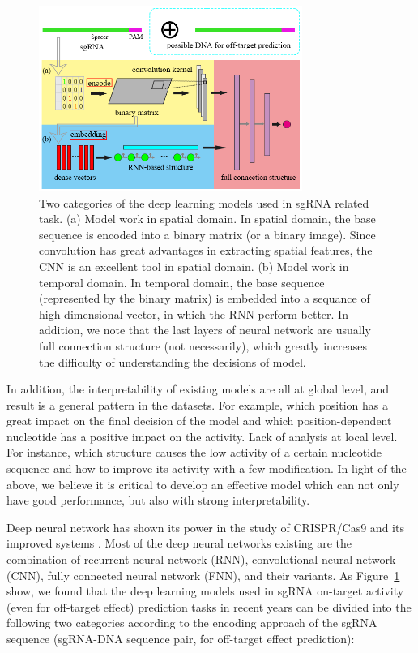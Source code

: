\documentclass{bioinfo}
\begin{document}
 \begin{figure}[!tpb]%
    \centerline{\includegraphics[width=86mm]{NEWcategory.png}}
    \caption{Two categories of the deep learning models used in sgRNA related task. 
    (a) Model work in spatial domain. 
    In spatial domain, the base sequence is encoded into a binary matrix (or a binary image). 
    Since convolution has great advantages in extracting spatial features, the CNN is an excellent tool in spatial domain. 
    (b) Model work in temporal domain. 
    In temporal domain, the base sequence (represented by the binary matrix) is embedded into a sequance of high-dimensional vector, 
    in which the RNN perform better.
    In addition, we note that the last layers of neural network are usually full connection structure (not necessarily), 
    which greatly increases the difficulty of understanding the decisions of model.
    }\label{fig:category}
\end{figure}

 In addition, the interpretability of existing models are all at global level, and result is a general pattern in the datasets. 
For example, which position has a great impact on the final decision of the model and which position-dependent nucleotide has a positive impact on the activity. 
Lack of analysis at local level. 
For instance, which structure causes the low activity of a certain nucleotide sequence and how to improve its activity with a few modification. 
In light of the above, we believe it is critical to develop an effective model which can not only have good performance, but also with strong interpretability.

Deep neural network has shown its power in the study of CRISPR/Cas9 and its improved systems \citep{liu2019computational}. 
Most of the deep neural networks existing are the combination of recurrent neural network (RNN), convolutional neural network (CNN), fully connected neural network (FNN), and their variants. 
As Figure~\ref{fig:category} show,  
we found that the deep learning models used in sgRNA on-target activity (even for off-target effect) prediction tasks in recent years can be divided into the following two categories according to the encoding approach of the sgRNA sequence (sgRNA-DNA sequence pair, for off-target effect prediction):
\end{document}
